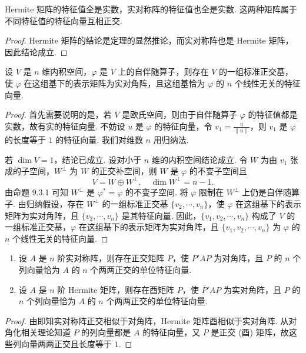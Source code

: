 \documentclass[../../main.tex]{subfiles}
\begin{document}
\begin{corollary}\label{corollary:Hermite矩阵和实对称矩阵关于特征值的相关性质}
Hermite 矩阵的特征值全是实数，实对称阵的特征值也全是实数. 这两种矩阵属于不同特征值的特征向量互相正交.
\end{corollary}
\begin{proof}
Hermite 矩阵的结论是定理的显然推论，而实对称阵也是 Hermite 矩阵，因此结论成立.
\end{proof}

\begin{theorem}\label{theorem:关于自伴随算子正交对角化}
设 $V$ 是 $n$ 维内积空间，$\varphi$ 是 $V$ 上的自伴随算子，则存在 $V$ 的一组标准正交基，使 $\varphi$ 在这组基下的表示矩阵为实对角阵，且这组基恰为 $\varphi$ 的 $n$ 个线性无关的特征向量.
\end{theorem}
\begin{proof}
首先需要说明的是，若 $V$ 是欧氏空间，则由于自伴随算子 $\varphi$ 的特征值都是实数，故有实的特征向量. 不妨设 $u$ 是 $\varphi$ 的特征向量，令 $v_1 = \frac{u}{\|u\|}$，则 $v_1$ 是 $\varphi$ 的长度等于 $1$ 的特征向量. 我们对维数 $n$ 用归纳法.

若 $\dim V = 1$，结论已成立. 设对小于 $n$ 维的内积空间结论成立. 令 $W$ 为由 $v_1$ 张成的子空间，$W^\perp$ 为 $W$ 的正交补空间，则 $W$ 是 $\varphi$ 的不变子空间且
\[
V = W \oplus W^\perp, \quad \dim W^\perp = n - 1.
\]
由命题 9.3.1 可知 $W^\perp$ 是 $\varphi^* = \varphi$ 的不变子空间. 将 $\varphi$ 限制在 $W^\perp$ 上仍是自伴随算子. 由归纳假设，存在 $W^\perp$ 的一组标准正交基 $\{v_2,\cdots,v_n\}$，使 $\varphi$ 在这组基下的表示矩阵为实对角阵，且 $\{v_2,\cdots,v_n\}$ 是其特征向量. 因此，$\{v_1,v_2,\cdots,v_n\}$ 构成了 $V$ 的一组标准正交基，$\varphi$ 在这组基下的表示矩阵为实对角阵，且 $\{v_1,v_2,\cdots,v_n\}$ 为 $\varphi$ 的 $n$ 个线性无关的特征向量.
\end{proof}

\begin{theorem}\label{theorem:实对称和Hermite矩阵的正交对角化}
\begin{enumerate}
\item 设 $A$ 是 $n$ 阶实对称阵，则存在正交矩阵 $P$，使 $P'AP$ 为对角阵，且 $P$ 的 $n$ 个列向量恰为 $A$ 的 $n$ 个两两正交的单位特征向量.

\item 设 $A$ 是 $n$ 阶 Hermite 矩阵，则存在酉矩阵 $P$，使 $\overline{P}'AP$ 为实对角阵，且 $P$ 的 $n$ 个列向量恰为 $A$ 的 $n$ 个两两正交的单位特征向量.
\end{enumerate}
\end{theorem}
\begin{proof}
由即知实对称阵正交相似于对角阵，Hermite 矩阵酉相似于实对角阵. 从对角化相关理论知道 $P$ 的列向量都是 $A$ 的特征向量，又 $P$ 是正交 (酉) 矩阵，故这些列向量两两正交且长度等于 $1$. 
\end{proof}
\end{document}
